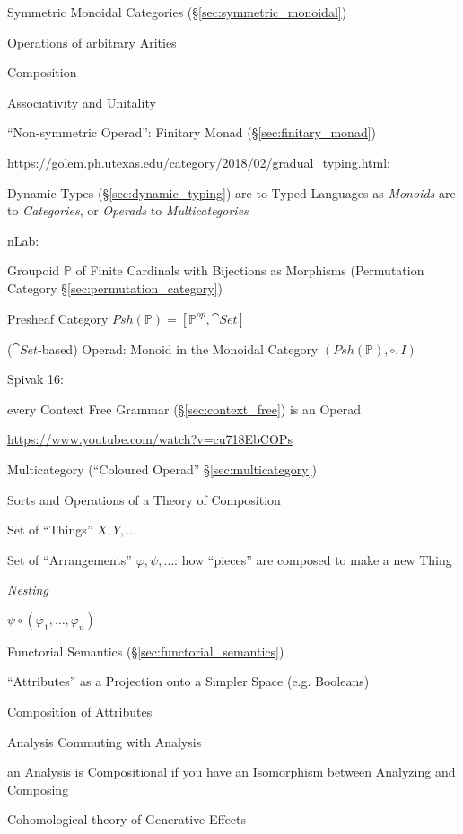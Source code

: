 Symmetric Monoidal Categories
(\S\ref{sec:symmetric_monoidal})

Operations of arbitrary Arities

Composition

Associativity and Unitality

``Non-symmetric Operad'': Finitary Monad (\S\ref{sec:finitary_monad})

\url{https://golem.ph.utexas.edu/category/2018/02/gradual_typing.html}:

Dynamic Types (\S\ref{sec:dynamic_typing}) are to Typed Languages as
\emph{Monoids} are to \emph{Categories}, or \emph{Operads} to
\emph{Multicategories}

nLab:

Groupoid $\mathbb{P}$ of Finite Cardinals with Bijections as Morphisms
(Permutation Category \S\ref{sec:permutation_category})

Presheaf Category $Psh(\mathbb{P}) = [\mathbb{P}^{op}, \cat{Set}]$

($\cat{Set}$-based) Operad: Monoid in the Monoidal Category
$(Psh(\mathbb{P}), \circ, I)$ %

Spivak 16:

every Context Free Grammar (\S\ref{sec:context_free}) is an Operad

\url{https://www.youtube.com/watch?v=cu718EbCOPs}


Multicategory (``Coloured Operad'' \S\ref{sec:multicategory})

Sorts and Operations of a Theory of Composition

Set of ``Things'' $X,Y,\ldots$

Set of ``Arrangements'' $\varphi,\psi,\ldots$: how ``pieces'' are
composed to make a new Thing

\emph{Nesting}

$\psi \circ (\varphi_1, \ldots, \varphi_n)$

Functorial Semantics (\S\ref{sec:functorial_semantics})

``Attributes'' as a Projection onto a Simpler Space (e.g. Booleans)

Composition of Attributes

Analysis Commuting with Analysis

an Analysis is Compositional if you have an Isomorphism between
Analyzing and Composing

Cohomological theory of Generative Effects


